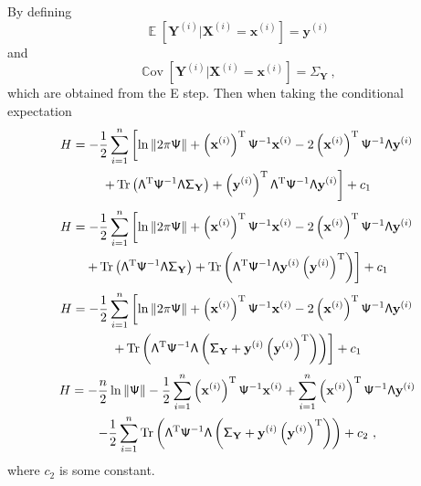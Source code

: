 \documentclass[12pt]{report}
\DeclareMathOperator{\expectation}{\mathbb{E}}
\DeclareMathOperator{\cov}{\mathbb{C}ov}
\DeclareMathOperator{\trace}{Tr}
\newcommand{\T}{^\textup{T}}
\newcommand{\vect}[1]{\mathbf{#1}}
\newcommand{\matr}[1]{\mathsf{#1}}
\begin{document}
By defining
\begin{equation}
\expectation\left[\vect{Y}^{(i)}|\vect{X}^{(i)}=\vect{x}^{(i)}\right]=\vect{y}^{(i)}
\end{equation}
and
\begin{equation}
\cov\left[\vect{Y}^{(i)}|\vect{X}^{(i)}=\vect{x}^{(i)}\right] = \matr{\Sigma}_{\vect{Y}}\ ,
\end{equation}
which are obtained from the E step. Then when taking the conditional expectation
\begin{multline*}
H = -\frac{1}{2}\sum_{i=1}^{n}\left[
\ln\|2\pi\matr{\Psi}\|+\left(\vect{x}^{(i)}\right)\T\matr{\Psi}^{-1}\vect{x}^{(i)}-2\left(\vect{x}^{(i)}\right)\T\matr{\Psi}^{-1}\matr{\Lambda}\vect{y}^{(i)}\right.\\
\left.+\trace\left(\matr{\Lambda}\T\matr{\Psi}^{-1}\matr{\Lambda}\matr{\Sigma}_{\vect{Y}}\right)+\left(\vect{y}^{(i)}\right)\T\matr{\Lambda}\T\matr{\Psi}^{-1}\matr{\Lambda}\vect{y}^{(i)}
\right]+c_1
\end{multline*}
\begin{multline*}
H = -\frac{1}{2}\sum_{i=1}^{n}\left[
\ln\|2\pi\matr{\Psi}\|+\left(\vect{x}^{(i)}\right)\T\matr{\Psi}^{-1}\vect{x}^{(i)}-2\left(\vect{x}^{(i)}\right)\T\matr{\Psi}^{-1}\matr{\Lambda}\vect{y}^{(i)}\right.\\
\left.+\trace\left(\matr{\Lambda}\T\matr{\Psi}^{-1}\matr{\Lambda}\matr{\Sigma}_{\vect{Y}}\right)+\trace\left(\matr{\Lambda}\T\matr{\Psi}^{-1}\matr{\Lambda}\vect{y}^{(i)}\left(\vect{y}^{(i)}\right)\T\right)
\right]+c_1
\end{multline*}
\begin{multline*}
H = -\frac{1}{2}\sum_{i=1}^{n}\left[
\ln\|2\pi\matr{\Psi}\|+\left(\vect{x}^{(i)}\right)\T\matr{\Psi}^{-1}\vect{x}^{(i)}-2\left(\vect{x}^{(i)}\right)\T\matr{\Psi}^{-1}\matr{\Lambda}\vect{y}^{(i)}\right.\\
\left.+\trace\left(\matr{\Lambda}\T\matr{\Psi}^{-1}\matr{\Lambda}\left(\matr{\Sigma}_{\vect{Y}}+\vect{y}^{(i)}\left(\vect{y}^{(i)}\right)\T\right)\right)
\right]+c_1
\end{multline*}
\begin{multline*}
H = -\frac{n}{2}
\ln\|\matr{\Psi}\|
-\frac{1}{2}\sum_{i=1}^{n}\left(\vect{x}^{(i)}\right)\T\matr{\Psi}^{-1}\vect{x}^{(i)}
+\sum_{i=1}^{n}\left(\vect{x}^{(i)}\right)\T\matr{\Psi}^{-1}\matr{\Lambda}\vect{y}^{(i)}\\
-\frac{1}{2}\sum_{i=1}^{n}\trace\left(\matr{\Lambda}\T\matr{\Psi}^{-1}\matr{\Lambda}\left(\matr{\Sigma}_{\vect{Y}}+\vect{y}^{(i)}\left(\vect{y}^{(i)}\right)\T\right)\right)
+c_2 \ ,
\end{multline*}
where $c_2$ is some constant.
\end{document}
